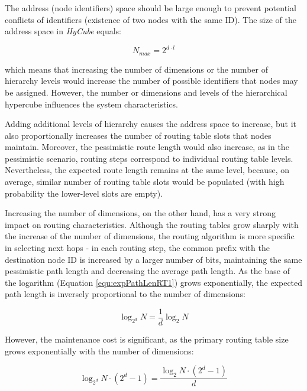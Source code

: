 The address (node identifiers) space should be large enough to prevent potential conflicts of identifiers (existence of two nodes with the same ID). The size of the address space in \emph{HyCube} equals:

\begin{equation}
N_{max} = 2^{d \cdot l}
\end{equation}

\noindent
which means that increasing the number of dimensions or the number of hierarchy levels would increase the number of possible identifiers that nodes may be assigned. However, the number or dimensions and levels of the hierarchical hypercube influences the system characteristics.

Adding additional levels of hierarchy causes the address space to increase, but it also proportionally increases the number of routing table slots that nodes maintain. Moreover, the pessimistic route length would also increase, as in the pessimistic scenario, routing steps correspond to individual routing table levels. Nevertheless, the expected route length remains at the same level, because, on average, similar number of routing table slots would be populated (with high probability the lower-level slots are empty).

Increasing the number of dimensions, on the other hand, has a very strong impact on routing characteristics. Although the routing tables grow sharply with the increase of the number of dimensions, the routing algorithm is more specific in selecting next hops - in each routing step, the common prefix with the destination node ID is increased by a larger number of bits, maintaining the same pessimistic path length and decreasing the average path length. As the base of the logarithm (Equation \ref{equ:expPathLenRT1}) grows exponentially, the expected path length is inversely proportional to the number of dimensions:

\begin{equation}
\label{equ:expPathLenRT1}
\log_{2^d} N = \frac{1}{d} \log_2 N
\end{equation}

\noindent
However, the maintenance cost is significant, as the primary routing table size grows exponentially with the number of dimensions:

\begin{equation}
\log_{2^d} N \cdot (2^d-1) = \frac{\log_{2} N \cdot (2^d-1)}{d}
\end{equation}

